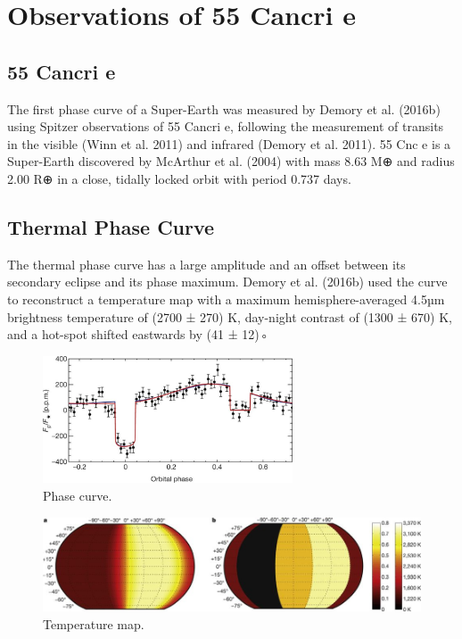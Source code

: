 \section{Observations of 55 Cancri e}

\subsection*{55 Cancri e}


The first phase curve of a Super-Earth was measured by Demory et al. (2016b) using Spitzer observations of 55 Cancri e, following the measurement of
transits in the visible (Winn et al. 2011) and infrared
(Demory et al. 2011). 55 Cnc e is a Super-Earth discovered by McArthur et al. (2004) with mass 8.63 M⊕ and
radius 2.00 R⊕ in a close, tidally locked orbit with period
0.737 days.

\subsection*{Thermal Phase Curve}

The thermal phase curve has a large amplitude and an offset between its secondary eclipse and its
phase maximum. Demory et al. (2016b) used the curve
to reconstruct a temperature map with a maximum
hemisphere-averaged 4.5µm brightness temperature of
(2700 ± 270) K, day-night contrast of (1300 ± 670) K,
and a hot-spot shifted eastwards by (41 ± 12)◦

\begin{figure}
  \centering
  \includegraphics[width=0.66\textwidth]{figures/linking-climate-55cnce/demory-phase-curve.jpg}
  \caption{Phase curve.}
  \label{fig:demory-phase-curve}
\end{figure}

\begin{figure}
  \centering
  \includegraphics[width=1.0\textwidth]{figures/linking-climate-55cnce/demory-temperature-map.jpg}
  \caption{Temperature map.}
  \label{fig:demory-temperature-map}
\end{figure}

